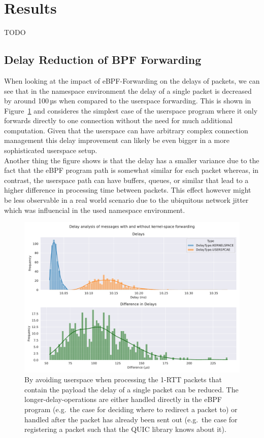 \section{Results}\label{sec:results}
TODO 

\subsection{Delay Reduction of BPF Forwarding}
When looking at the impact of eBPF-Forwarding on the delays of packets, we can see that
in the namespace environment the delay of a single packet is decreased by around 100\,µs
when compared to the userspace forwarding. This is shown in Figure~\ref{fig:delay-improvement} and 
consideres the simplest case of the userspace program where it only forwards directly to one connection
without the need for much additional computation. Given that the userspace can have arbitrary complex 
connection management this delay improvement can likely be even bigger in a more sophisticated userspace
setup.
\\
Another thing the figure shows is that the delay has a smaller variance due to the fact that the eBPF program
path is somewhat similar for each packet whereas, in contrast, the userspace path can have buffers, queues, 
or similar that lead to a higher difference in processing time between packets. 
This effect however might be less observable in a real world scenario due to the ubiquitous network jitter which 
was influencial in the used namespace environment.
\begin{figure}[htbp]
    \centering
    \includegraphics[width=\textwidth]{figures/04_testing_and_results/delays_small_packets_simple_userspace.pdf}
    \caption{By avoiding userspace when processing the 1-RTT packets that contain the payload
    the delay of a single packet can be reduced. The longer-delay-operations are either handled
    directly in the eBPF program (e.g.~the case for deciding where to redirect a packet to) or 
    handled after the packet has already been sent out (e.g.~the case for registering a packet 
    such that the QUIC library knows about it).}\label{fig:delay-improvement}
\end{figure}

